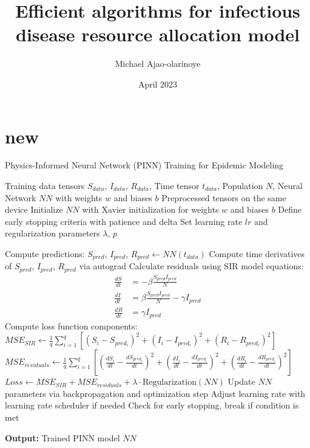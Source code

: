 \documentclass[12pt, letterpaper]{report}
\title{Efficient algorithms for infectious disease resource allocation model}
\author{Michael Ajao-olarinoye}
\date{April 2023}
\begin{document}
\maketitle

\section{new}
\begin{algorithm}
\caption{Physics-Informed Neural Network (PINN) Training for Epidemic Modeling}
\begin{algorithmic}[1]
\Require Training data tensors $S_{data}$, $I_{data}$, $R_{data}$, Time tensor $t_{data}$, Population $N$, Neural Network $NN$ with weights $w$ and biases $b$
\Ensure Preprocessed tensors on the same device
\State Initialize $NN$ with Xavier initialization for weights $w$ and biases $b$
\State Define early stopping criteria with patience and delta
\State Set learning rate $lr$ and regularization parameters $\lambda$, $p$

    \State Compute predictions: $S_{pred}$, $I_{pred}$, $R_{pred} \gets NN(t_{data})$
    \State Compute time derivatives of $S_{pred}$, $I_{pred}$, $R_{pred}$ via autograd
    \State Calculate residuals using SIR model equations:
    \begin{align*}
    \frac{dS}{dt} & = -\beta \frac{S_{pred} I_{pred}}{N} \\
    \frac{dI}{dt} & = \beta \frac{S_{pred} I_{pred}}{N} - \gamma I_{pred} \\
    \frac{dR}{dt} & = \gamma I_{pred}
    \end{align*}
    \State Compute loss function components:
    \State $MSE_{SIR} \gets \frac{1}{q} \sum_{i=1}^{q} \left[ \left(S_{i} - S_{pred_i}\right)^2 + \left(I_{i} - I_{pred_i}\right)^2 + \left(R_{i} - R_{pred_i}\right)^2 \right]$
    \State $MSE_{residuals} \gets \frac{1}{q} \sum_{i=1}^{q} \left[ \left(\frac{dS_i}{dt} - \frac{dS_{pred_i}}{dt}\right)^2 + \left(\frac{dI_i}{dt} - \frac{dI_{pred_i}}{dt}\right)^2 + \left(\frac{dR_i}{dt} - \frac{dR_{pred_i}}{dt}\right)^2 \right]$
    \State $Loss \gets MSE_{SIR} + MSE_{residuals} + \lambda \cdot \text{Regularization}(NN)$
    \State Update $NN$ parameters via backpropagation and optimization step
    \State Adjust learning rate with learning rate scheduler if needed
    \State Check for early stopping, break if condition is met
\EndFor

\State \textbf{Output:} Trained PINN model $NN$
\end{algorithmic}
\end{algorithm}
\end{document}
